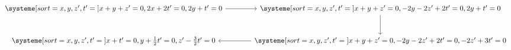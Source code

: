 \documentclass{standalone}
\begin{document}
$
\begin{tikzcd}[column sep=large, row sep=large]
    \systeme[sort={x, y, z', t' = {}}]{%
        x + y + z' = 0,
        2x + 2t' = 0,
        2y + t' = 0
    }
    \arrow[r] &
    \systeme[sort={x, y, z', t' = {}}]{%
        x + y + z' = 0,
        -2y - 2z' + 2t' = 0,
        2y +t' = 0
    }
    \arrow[d] \\
    \systeme[sort={x, y, z', t' = {}}]{%
        x + t' = 0,
        y + \frac{1}{2}t' = 0,
        z' - \frac{3}{2}t' = 0
    } &
    \systeme[sort={x, y, z', t' = {}}]{%
        x + y + z' = 0,
        -2y -2z' + 2t' = 0,
        -2z' + 3t' = 0
    }
    \arrow[l]
\end{tikzcd}
$
\end{document}
